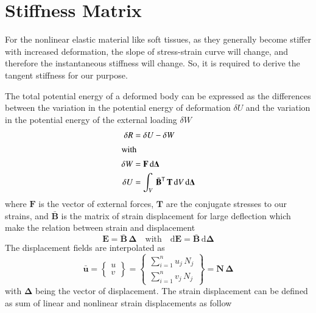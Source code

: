 \section{Stiffness Matrix}
For the nonlinear elastic material like soft tissues, as they generally become stiffer with increased deformation, the slope of stress-strain curve will change, and therefore the instantaneous stiffness will change. So, it is required to derive the tangent stiffness for our purpose. 

The total potential energy of a deformed body can be expressed as the differences between the variation in the potential energy of deformation $\delta{U}$ and the variation in the potential energy of the external loading $\delta{W}$ \cite{Yangetal10}
\begin{subequations}
\begin{align}
\delta{R} &= \delta{U} - \delta{W}\\
\intertext{with}
\delta{W} & = \mathbf{F} \, \mathrm{d} \boldsymbol{\Delta}\\
\delta{U} & = \int_{V} \, \bar{\mathbf{B}}^{\mathsf{T}} \, \mathbf{T} \, \mathrm{d} V \, \mathrm{d} \boldsymbol{\Delta}
\end{align}
\label{principle}
\end{subequations}
where $\mathbf{F}$ is the vector of external forces, $\mathbf{T}$ are the conjugate stresses to our strains, and $\bar{\mathbf{B}}$ is the matrix of strain displacement for large deflection which make the relation between strain and displacement 
\begin{equation}
\mathbf{E} = \bar{\mathbf{B}} \,  \boldsymbol{\Delta} \quad \text{with} \quad \mathrm{d} \mathbf{E} = \bar{\mathbf{B}} \, \mathrm{d} \boldsymbol{\Delta}
\label{strain} 
\end{equation}
The displacement fields are interpolated as
\begin{equation}
\bar{\mathbf{ u}} = 
\begin{Bmatrix}
u \\
v     
\end{Bmatrix}
=
\begin{Bmatrix}
\sum_{i=1}^{n} u_j \, N_j \\
\sum_{i=1}^{n} v_j \, N_j     
\end{Bmatrix}
= \mathbf{N} \, \boldsymbol{\Delta}
\end{equation}
with $\boldsymbol{\Delta}$ being the vector of displacement. 
The strain displacement can be defined as sum of linear and nonlinear strain displacements as follow
